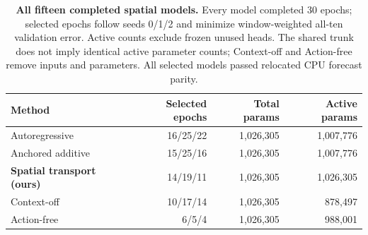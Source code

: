 \begin{table}[p]\centering\footnotesize
\setlength{\tabcolsep}{4pt}\renewcommand{\arraystretch}{1.12}
\begin{tabular}{lrrr}\toprule
Method & Selected epochs & Total params & Active params\\\midrule
Autoregressive & 16/25/22 & 1,026,305 & 1,007,776\\
Anchored additive & 15/25/16 & 1,026,305 & 1,007,776\\
\rowcolor{orange!9}
\textbf{Spatial transport (ours)} & 14/19/11 & 1,026,305 & 1,026,305\\
Context-off & 10/17/14 & 1,026,305 & 878,497\\
Action-free & 6/5/4 & 1,026,305 & 988,001\\
\bottomrule\end{tabular}
\caption{\textbf{All fifteen completed spatial models.} Every model completed 30 epochs; selected epochs follow seeds 0/1/2 and minimize window-weighted all-ten validation error. Active counts exclude frozen unused heads. The shared trunk does not imply identical active parameter counts; Context-off and Action-free remove inputs and parameters. All selected models passed relocated CPU forecast parity.}
\label{tab:spatial-checkpoints}\end{table}
